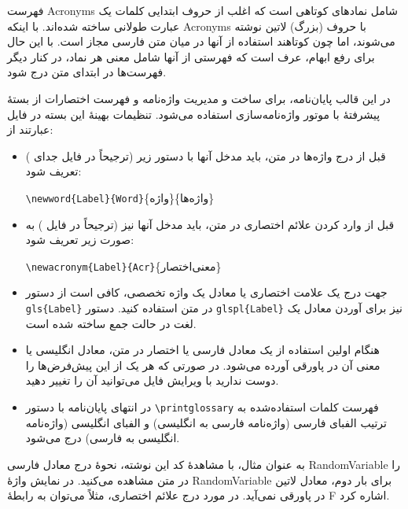 فهرست
\glspl{Acronym}
شامل نمادهای کوتاهی است که اغلب از حروف ابتدایی کلمات یک عبارت طولانی ساخته شده‌اند. با اینکه
\glspl{Acronym}
با حروف (بزرگ) لاتین نوشته می‌شوند، اما چون کوتاهند استفاده از آنها در میان متن فارسی مجاز است. با این حال برای رفع ابهام، عرف است که فهرستی از آنها شامل معنی هر نماد، در کنار دیگر فهرست‌ها در ابتدای متن درج شود.

در این قالب پایان‌نامه، برای ساخت و مدیریت واژه‌نامه و فهرست اختصارات از بستهٔ پیشرفتهٔ
با موتور واژه‌نامه‌سازی
استفاده می‌شود. تنظیمات بهینهٔ این بسته در فایل
عبارتند از:
\begin{itemize}
	\item
	      قبل از درج واژه‌ها در متن، باید مدخل آنها با دستور زیر (ترجیحاً در فایل جدای ) تعریف شود:
	      \begin{LTR}
		      \verb|\newword{Label}{Word}|\{واژه\}\{واژه‌ها\}
	      \end{LTR}

	\item
	      قبل از وارد کردن علائم اختصاری در متن، باید مدخل آنها نیز (ترجیحاً در فایل ) به صورت زیر تعریف شود:
	      \begin{LTR}
		      \verb|\newacronym{Label}{Acr}|\{معنی‌اختصار\}
	      \end{LTR}

	\item
	      جهت درج یک علامت اختصاری یا معادل یک واژه تخصصی، کافی است از دستور
	      \verb|gls{Label}|
	      در متن استفاده کنید. دستور
	      \verb|glspl{Label}|
	      نیز برای آوردن معادل یک لغت در حالت جمع ساخته شده است.

	\item
	      هنگام اولین استفاده از یک معادل فارسی یا اختصار در متن، معادل انگلیسی یا معنی آن در پاورقی آورده می‌شود. در صورتی که هر یک از این پیش‌فرض‌ها را دوست ندارید با ویرایش فایل
	      می‌توانید آن را تغییر دهید.

	\item
	      در انتهای پایان‌نامه با دستور
	      \verb|\printglossary|
	      فهرست کلمات استفاده‌شده به ترتیب الفبای فارسی (واژه‌نامه فارسی به انگلیسی) و الفبای انگلیسی (واژه‌نامه انگلیسی به فارسی) درج می‌شود.
\end{itemize}

به عنوان مثال، با مشاهدهٔ کد این نوشته، نحوهٔ درج معادل فارسی
\gls{RandomVariable}
را در متن مشاهده می‌کنید.
در نمایش واژهٔ
\gls{RandomVariable}
برای بار دوم، معادل لاتین در پاورقی نمی‌آید.
در مورد درج علائم اختصاری، مثلاً می‌توان به رابطهٔ
\gls{F}
اشاره کرد.

